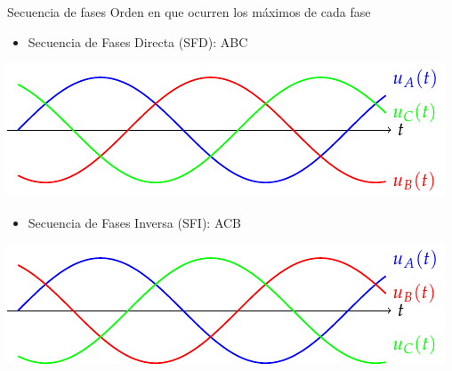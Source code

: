\documentclass[aspectratio=169, usenames,svgnames,dvipsnames]{beamer}
\begin{document}
\begin{frame}{Secuencia de fases} \label{diapo:secuencias_fases}
    \vspace{2mm}
    Orden en que ocurren los máximos de cada fase
    \begin{itemize}
        \item Secuencia de Fases Directa (\alert{SFD}): \hspace{3mm}ABC
    \end{itemize}

    \vspace{-3mm}
    \begin{center}
        \includegraphics[height=0.34\textheight]{../figs/TensionesTrifasica_ABC.pdf}
    \end{center}

    \vspace{-2mm}
    \begin{itemize}
        \item Secuencia de Fases Inversa (\alert{SFI}): \hspace{5mm}ACB
    \end{itemize}

    \vspace{-3mm}
    \begin{center}
        \includegraphics[height=0.305\textheight]{../figs/TensionesTrifasica_ACB.pdf}
    \end{center}
\end{frame}

\end{document}
